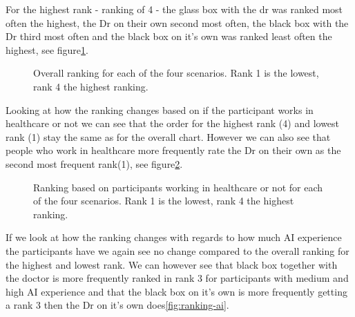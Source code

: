 \documentclass[manuscript,screen,review]{acmart}
\begin{document}
For the highest rank - ranking of 4 - the glass box with the dr was ranked most often the highest, the Dr on their own second most often, the black box with the Dr third most often and the black box on it's own was ranked least often the highest, see figure\ref{fig:overall-ranking}.

\begin{figure}[H]
    \caption{Overall ranking for each of the four scenarios. Rank 1 is the lowest, rank 4 the highest ranking.}
    \label{fig:overall-ranking}
\end{figure}

Looking at how the ranking changes based on if the participant works in healthcare or not we can see that the order for the highest rank (4) and lowest rank (1) stay the same as for the overall chart. However we can also see that people who work in healthcare more frequently rate the Dr on their own as the second most frequent rank(1), see figure\ref{fig:ranking-healthcare}.

\begin{figure}[H]
    \caption{Ranking based on participants working in healthcare or not for each of the four scenarios. Rank 1 is the lowest, rank 4 the highest ranking.}
    \label{fig:ranking-healthcare}
\end{figure}

If we look at how the ranking changes with regards to how much AI experience the participants have we again see no change compared to the overall ranking for the highest and lowest rank. We can however see that black box together with the doctor is more frequently ranked in rank 3 for participants with medium and high AI experience and that the black box on it's own is more frequently getting a rank 3 then the Dr on it's own does\ref{fig:ranking-ai}.
\end{document}
